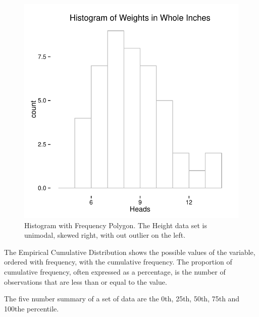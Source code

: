\documentclass[nohyper,justified]{tufte-handout}\usepackage[]{graphicx}\usepackage[]{color}
\makeatletter
\def\maxwidth{ %
  \ifdim\Gin@nat@width>\linewidth
    \linewidth
  \else
    \Gin@nat@width
  \fi
}
\newenvironment{knitrout}{}{} %
\makeatother
\begin{document}
\begin{knitrout}
\color{fgcolor}\begin{figure}[h!]

{\centering \includegraphics[width=\maxwidth]{figure/graphics-histogram-1} 

}

\caption[Histogram with Frequency Polygon]{Histogram with Frequency Polygon. The Height data set is unimodal, skewed right, with out outlier on the left. }\label{fig:histogram}
\end{figure}


\end{knitrout}


The Empirical Cumulative Distribution shows the possible values of the variable, ordered with frequency, with the cumulative frequency. The proportion of cumulative frequency, often expressed as a percentage, is the number of observations that are less than or equal to the value.

The five number summary of a set of data are the 0th, 25th, 50th, 75th and 100the percentile.
\end{document}
